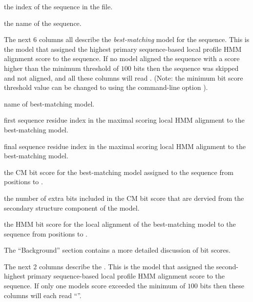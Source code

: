 \begin{wideitem}
\item[\emprog{idx}] the index of the sequence in the file.

\item[\emprog{sequence name}] the name of the sequence.
\end{wideitem}

The next 6 columns all describe the \emph{best-matching} model for the
sequence. This is the model that assigned the highest primary
sequence-based local profile HMM alignment score to the sequence. 
If no model aligned the sequence with a score higher than the minimum
threshold of $100$ bits then the sequence was skipped and not
aligned, and all these columns will read \prog{-}. (Note: the minimum
bit score threshold value can be changed to  using the
 command-line option ). 

\begin{wideitem}
\item[\emprog{model name}] name of best-matching model.

\item[\emprog{beg}] first sequence residue index in the maximal
  scoring local HMM alignment to the best-matching model.

\item[\emprog{end}] final sequence residue index in the maximal
  scoring local HMM alignment to the best-matching model.

\item[\emprog{CM sc}] the CM bit score for the best-matching model
  assigned to the sequence from positions  to .

\item[\emprog{struct}] the number of extra bits included in the
  CM bit score that are dervied from the secondary structure component
  of the model.

\item[\emprog{HMM sc}] the HMM bit score for the local alignment of
  the best-matching model to the sequence from positions  to
  .
\end{wideitem}

The ``Background'' section contains a more detailed discussion of bit
scores.

The next 2 columns describe the . This is the
model that assigned the second-highest primary sequence-based local 
profile HMM alignment score to the sequence. If only one models score
exceeded the minimum of $100$ bits then these columns will each read
``\prog{-}''.

